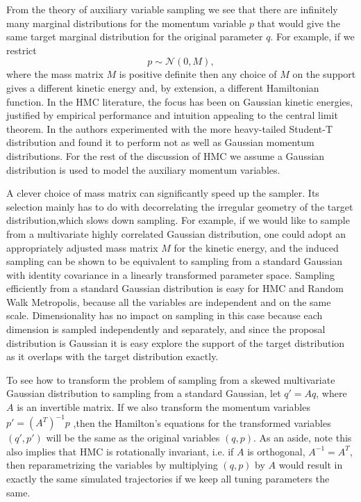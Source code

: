 \documentclass[12pt]{report}
\begin{document}
From the theory of auxiliary variable sampling we see that there are infinitely
many marginal distributions for the momentum variable $p$ that would give the
same target marginal distribution for the original parameter $q$. For example,
if we restrict 
\[ p \sim \mathcal{N}(0,M), \]
where the mass matrix $M$ is positive definite then any choice of $M$ on the support gives a
different kinetic energy and, by extension, a different Hamiltonian function. In the HMC
literature, the focus has been on Gaussian kinetic energies, 
justified by empirical performance and intuition appealing to the central limit
theorem. In \cite{girolami2011riemann} the authors experimented
with the more heavy-tailed Student-T distribution and found it to perform not as
well
as Gaussian momentum distributions. For the rest of the discussion of HMC we
assume a Gaussian distribution is used to model the auxiliary momentum variables.

A clever choice of mass matrix can significantly speed up the sampler. Its
selection mainly has to do with decorrelating the irregular geometry of the
target distribution,which slows down sampling. For example, if we would like to sample from a multivariate
highly correlated Gaussian distribution, one could adopt an
appropriately adjusted mass
matrix $M$ for the kinetic energy, and the induced sampling can be shown to be
equivalent to sampling from a standard Gaussian with identity covariance in a
linearly transformed parameter space. Sampling efficiently from a standard Gaussian
distribution is easy
for HMC and Random Walk Metropolis, because all the variables are independent and on
the same scale. Dimensionality has no impact on sampling in this case because
each dimension is sampled independently and separately, and since the proposal
distribution is Gaussian it is easy explore the support of the target
distribution as it overlaps with the target distribution
exactly. 

To see how to transform the problem of sampling from a skewed multivariate
Gaussian distribution to sampling from a standard Gaussian, let $q' = Aq$, where $A$ is an invertible matrix. If we also
transform the momentum variables $p' = (A^T)^{-1}p$ ,then the
Hamilton's equations for the transformed variables $(q',p')$ will be the same as
the original variables $(q,p)$. As an aside, note this also implies that HMC is rotationally
invariant, i.e. if $A$ is orthogonal, $A^{-1} = A^T$, then reparametrizing the
variables by  multiplying $(q,p)$ by $A$ would result in exactly the same simulated
trajectories if we keep all tuning parameters the same.
\end{document}

